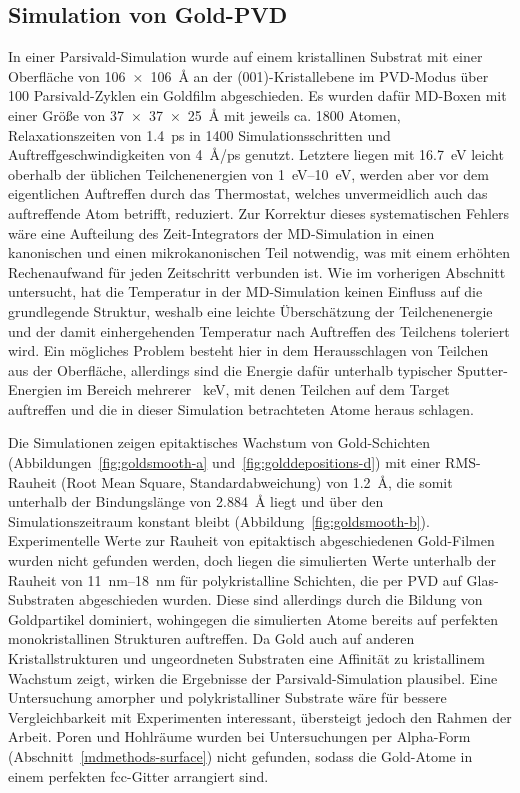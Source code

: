 \subsection{Simulation von Gold-PVD}

In einer Parsivald-Simulation wurde auf einem kristallinen Substrat mit einer Oberfläche von \SI{106x106}{\angstrom} an der (001)-Kristallebene im PVD-Modus über 100 Parsivald-Zyklen ein Goldfilm abgeschieden.
Es wurden dafür MD-Boxen mit einer Größe von \SI{37x37x25}{\angstrom} mit jeweils ca. \num{1800} Atomen, Relaxationszeiten von \SI{1.4}{\pico\second} in \num{1400} Simulationsschritten und Auftreffgeschwindigkeiten von \SI{4}{\angstrom/\pico\second} genutzt.
Letztere liegen mit \SI{16.7}{\electronvolt} leicht oberhalb der üblichen Teilchenenergien von \SIrange{1}{10}{\electronvolt}\cite{thompson_ii._1968}, werden aber vor dem eigentlichen Auftreffen durch das Thermostat, welches unvermeidlich auch das auftreffende Atom betrifft, reduziert.
Zur Korrektur dieses systematischen Fehlers wäre eine Aufteilung des Zeit-Integrators der MD-Simulation in einen kanonischen und einen mikrokanonischen Teil notwendig, was mit einem erhöhten Rechenaufwand für jeden Zeitschritt verbunden ist.
Wie im vorherigen Abschnitt untersucht, hat die Temperatur in der MD-Simulation keinen Einfluss auf die grundlegende Struktur, weshalb eine leichte Überschätzung der Teilchenenergie und der damit einhergehenden Temperatur nach Auftreffen des Teilchens toleriert wird.
Ein mögliches Problem besteht hier in dem Herausschlagen von Teilchen aus der Oberfläche, allerdings sind die Energie dafür unterhalb typischer Sputter-Energien im Bereich mehrerer \SI{}{\kilo\electronvolt}\cite{mattox_handbook_2010}, mit denen Teilchen auf dem Target auftreffen und die in dieser Simulation betrachteten Atome heraus schlagen.

Die Simulationen zeigen epitaktisches Wachstum von Gold-Schichten (Abbildungen~\ref{fig:goldsmooth-a} und~\ref{fig:golddepositions-d}) mit einer RMS-Rauheit (Root Mean Square, Standardabweichung) von \SI{1.2}{\angstrom}, die somit unterhalb der Bindungslänge von \SI{2.884}{\angstrom} liegt und über den Simulationszeitraum konstant bleibt (Abbildung~\ref{fig:goldsmooth-b}).
Experimentelle Werte zur Rauheit von epitaktisch abgeschiedenen Gold-Filmen wurden nicht gefunden werden, doch liegen die simulierten Werte unterhalb der Rauheit von \SIrange{11}{18}{\nano\meter} für polykristalline Schichten, die per PVD auf Glas-Substraten abgeschieden wurden\cite{svorcik_annealing_2011}.
Diese sind allerdings durch die Bildung von Goldpartikel dominiert, wohingegen die simulierten Atome bereits auf perfekten monokristallinen Strukturen auftreffen.
Da Gold auch auf anderen Kristallstrukturen und ungeordneten Substraten eine Affinität zu kristallinem Wachstum zeigt\cite{gottsche_uber_1956,everitt_evolution_2000}, wirken die Ergebnisse der Parsivald-Simulation plausibel.
Eine Untersuchung amorpher und polykristalliner Substrate wäre für bessere Vergleichbarkeit mit Experimenten\cite{adamov_electrical_1974} interessant, übersteigt jedoch den Rahmen der Arbeit.
Poren und Hohlräume wurden bei Untersuchungen per Alpha-Form (Abschnitt~\ref{mdmethods-surface}) nicht gefunden, sodass die Gold-Atome in einem perfekten fcc-Gitter arrangiert sind.

